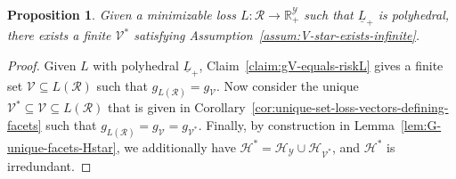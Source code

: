 \documentclass[11pt]{article}
\newcommand{\Comments}{1}
\newcommand{\mynote}[2]{\ifnum\Comments=1\textcolor{#1}{#2}\fi}
\newcommand{\raf}[1]{\mynote{darkgreen}{[RF: #1]}}
\newcommand{\jessie}[1]{\mynote{teal}{[JF: #1]}}
\newcommand{\reals}{\mathbb{R}}
\renewcommand{\H}{\mathcal{H}}
\newcommand{\R}{\mathcal{R}}
\newcommand{\V}{\mathcal{V}}
\newcommand{\Y}{\mathcal{Y}}
\newcommand{\risk}[1]{\underline{#1}}
\newcommand{\hyp}{\mathrm{hypo}}
\newtheorem{proposition}{Proposition}
\newtheorem{claim}{Claim}
\begin{document}
\begin{proposition}\label{prop:poly-risk-assumption-satisfied}
	Given a minimizable loss $L : \R \to \reals^\Y_+$ such that $\risk L_+$ is polyhedral, there exists a finite $\V^*$ satisfying Assumption~\ref{assum:V-star-exists-infinite}.
\end{proposition}
\begin{proof}
	Given $L$ with polyhedral $\risk L_+$, Claim~\ref{claim:gV-equals-riskL} gives a finite set $\V \subseteq L(\R)$ such that $g_{L(\R)} = g_\V$. 
	Now consider the unique $\V^* \subseteq \V \subseteq L(\R)$ that is given in Corollary~\ref{cor:unique-set-loss-vectors-defining-facets} such that $g_{L(\R)} = g_\V = g_{\V^*}$.
	Finally, by construction in Lemma~\ref{lem:G-unique-facets-Hstar}, we additionally have $\H^* = \H_\Y \cup \H_{\V^*}$, and $\H^*$ is irredundant.
\end{proof}






\end{document}
